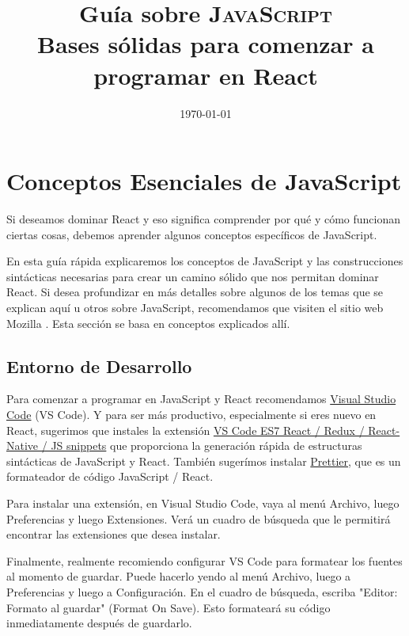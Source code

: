 \documentclass[a4paper, oneside, titlepage, 12pt]{book}
\title{%
	Guía sobre \textsc{JavaScript}\\
	\large Bases sólidas para comenzar a programar en React}
\date{\today}
\begin{document}
\maketitle
\tableofcontents
		
\chapter{Conceptos Esenciales de JavaScript}

Si deseamos dominar React y eso significa comprender por qué y cómo funcionan ciertas cosas, debemos aprender algunos conceptos específicos de JavaScript.
\newline

En esta guía rápida explicaremos los conceptos de JavaScript y las construcciones sintácticas necesarias para crear un camino sólido que nos permitan dominar React. Si desea profundizar en más detalles sobre algunos de los temas que se explican aquí u otros sobre JavaScript, recomendamos que visiten el sitio web Mozilla \cite{mozilla}. Esta sección se basa en conceptos explicados allí.

\section{Entorno de Desarrollo}

Para comenzar a programar en JavaScript y React recomendamos \href{https://code.visualstudio.com/} {Visual Studio Code} (VS Code). Y para ser más productivo, especialmente si eres nuevo en React, sugerimos que instales la extensión \href {https://marketplace.visualstudio.com/items?itemName=dsznajder.es7-react-js-snippets} {VS Code ES7 React / Redux / React-Native / JS snippets} que proporciona la generación rápida de estructuras sintácticas de JavaScript y React. También sugerímos instalar \href {https://marketplace.visualstudio.com/items?itemName=esbenp.prettier-vscode} {Prettier}, que es un formateador de código JavaScript / React.
\newline

Para instalar una extensión, en Visual Studio Code, vaya al menú Archivo, luego Preferencias y luego Extensiones. Verá un cuadro de búsqueda que le permitirá encontrar las extensiones que desea instalar.
\newline

Finalmente, realmente recomiendo configurar VS Code para formatear los fuentes al momento de guardar. Puede hacerlo yendo al menú Archivo, luego a Preferencias y luego a Configuración. En el cuadro de búsqueda, escriba "Editor: Formato al guardar" (Format On Save). Esto formateará su código inmediatamente después de guardarlo.
\end{document}
